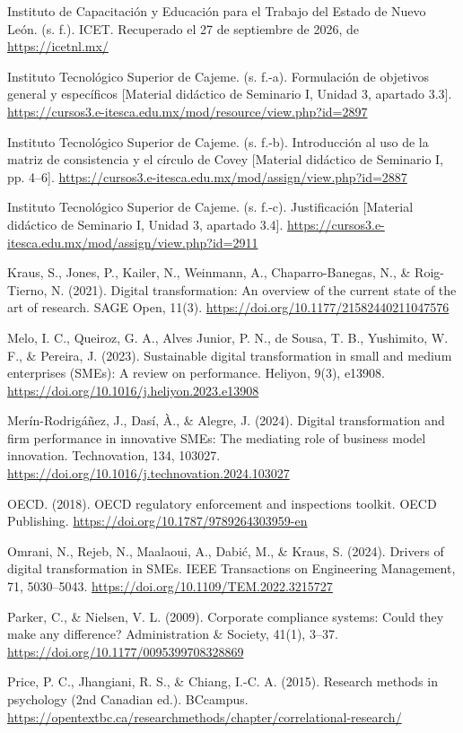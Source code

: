 {Instituto de Capacitación y Educación para el Trabajo del Estado de Nuevo León. (s. f.). ICET. Recuperado el 27 de septiembre de 2026, de \url{https://icetnl.mx/}


Instituto Tecnológico Superior de Cajeme. (s. f.-a). Formulación de objetivos general y específicos [Material didáctico de Seminario I, Unidad 3, apartado 3.3]. \url{https://cursos3.e-itesca.edu.mx/mod/resource/view.php?id=2897}


Instituto Tecnológico Superior de Cajeme. (s. f.-b). Introducción al uso de la matriz de consistencia y el círculo de Covey [Material didáctico de Seminario I, pp. 4–6]. \url{https://cursos3.e-itesca.edu.mx/mod/assign/view.php?id=2887}


Instituto Tecnológico Superior de Cajeme. (s. f.-c). Justificación [Material didáctico de Seminario I, Unidad 3, apartado 3.4]. \url{https://cursos3.e-itesca.edu.mx/mod/assign/view.php?id=2911}


Kraus, S., Jones, P., Kailer, N., Weinmann, A., Chaparro-Banegas, N., \& Roig-Tierno, N. (2021). Digital transformation: An overview of the current state of the art of research. SAGE Open, 11(3). \url{https://doi.org/10.1177/21582440211047576}


Melo, I. C., Queiroz, G. A., Alves Junior, P. N., de Sousa, T. B., Yushimito, W. F., \& Pereira, J. (2023). Sustainable digital transformation in small and medium enterprises (SMEs): A review on performance. Heliyon, 9(3), e13908. \url{https://doi.org/10.1016/j.heliyon.2023.e13908}


Merín-Rodrigáñez, J., Dasí, À., \& Alegre, J. (2024). Digital transformation and firm performance in innovative SMEs: The mediating role of business model innovation. Technovation, 134, 103027. \url{https://doi.org/10.1016/j.technovation.2024.103027}


OECD. (2018). OECD regulatory enforcement and inspections toolkit. OECD Publishing. \url{https://doi.org/10.1787/9789264303959-en}


Omrani, N., Rejeb, N., Maalaoui, A., Dabić, M., \& Kraus, S. (2024). Drivers of digital transformation in SMEs. IEEE Transactions on Engineering Management, 71, 5030–5043. \url{https://doi.org/10.1109/TEM.2022.3215727}


Parker, C., \& Nielsen, V. L. (2009). Corporate compliance systems: Could they make any difference? Administration \& Society, 41(1), 3–37. \url{https://doi.org/10.1177/0095399708328869}


Price, P. C., Jhangiani, R. S., \& Chiang, I.-C. A. (2015). Research methods in psychology (2nd Canadian ed.). BCcampus. \url{https://opentextbc.ca/researchmethods/chapter/correlational-research/}


}
